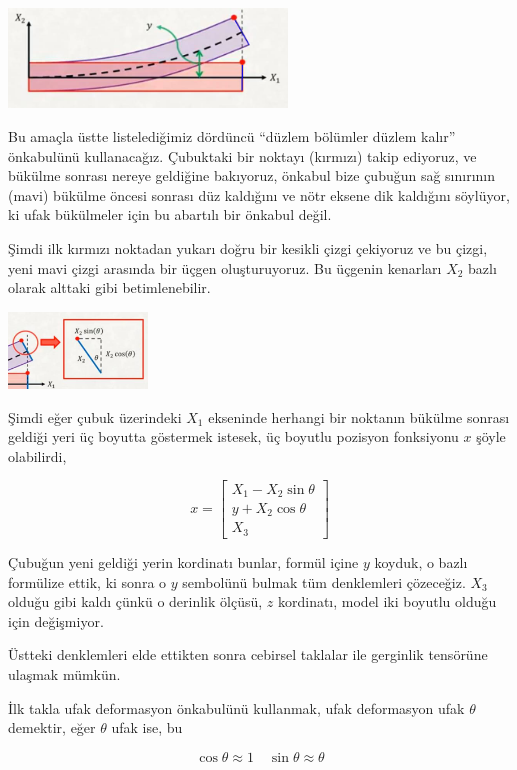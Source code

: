 \documentclass[12pt,fleqn]{article}\usepackage{../../common}
\begin{document}
\includegraphics[width=20em]{phy_020_strs_02_13.jpg}

Bu amaçla üstte listelediğimiz dördüncü ``düzlem bölümler düzlem kalır''
önkabulünü kullanacağız. Çubuktaki bir noktayı (kırmızı) takip ediyoruz, ve
bükülme sonrası nereye geldiğine bakıyoruz, önkabul bize çubuğun sağ sınırının
(mavi) bükülme öncesi sonrası düz kaldığını ve nötr eksene dik kaldığını
söylüyor, ki ufak bükülmeler için bu abartılı bir önkabul değil.

Şimdi ilk kırmızı noktadan yukarı doğru bir kesikli çizgi çekiyoruz ve bu çizgi,
yeni mavi çizgi arasında bir üçgen oluşturuyoruz. Bu üçgenin kenarları $X_2$
bazlı olarak alttaki gibi betimlenebilir.

\includegraphics[width=10em]{phy_020_strs_02_14.jpg}

Şimdi eğer çubuk üzerindeki $X_1$ ekseninde herhangi bir noktanın bükülme
sonrası geldiği yeri üç boyutta göstermek istesek, üç boyutlu pozisyon
fonksiyonu $x$ şöyle olabilirdi,

$$
x = \left[\begin{array}{c}
X_1 - X_2 \sin \theta \\ y + X_2 \cos\theta \\ X_3
\end{array}\right]
$$

Çubuğun yeni geldiği yerin kordinatı bunlar, formül içine $y$ koyduk, o bazlı
formülize ettik, ki sonra o $y$ sembolünü bulmak tüm denklemleri çözeceğiz.
$X_3$ olduğu gibi kaldı çünkü o derinlik ölçüsü, $z$ kordinatı, model iki
boyutlu olduğu için değişmiyor.

Üstteki denklemleri elde ettikten sonra cebirsel taklalar ile gerginlik
tensörüne ulaşmak mümkün.

İlk takla ufak deformasyon önkabulünü kullanmak, ufak deformasyon ufak $\theta$
demektir, eğer $\theta$ ufak ise, bu

$$
\cos\theta \approx 1 \quad \sin\theta \approx \theta
$$
\end{document}
